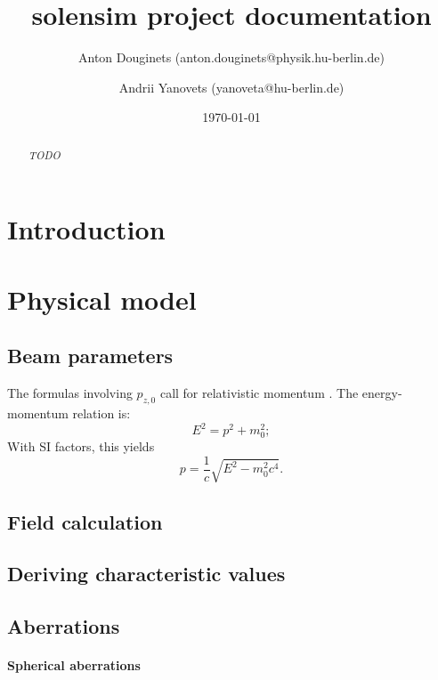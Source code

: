 \documentclass[a4paper,12pt]{article}
\title{solensim project documentation}
\author{Anton Douginets (anton.douginets@physik.hu-berlin.de)
	\and
	Andrii Yanovets (yanoveta@hu-berlin.de)}
\date{\today}
\begin{document}
\thispagestyle{empty}
\maketitle

\begin{abstract}
\textit{TODO}
\end{abstract}

\tableofcontents

\newpage

\section{Introduction}
\newpage

\section{Physical model}
\subsection{Beam parameters}

The formulas involving $p_{z,0}$ call for relativistic momentum \cite[p. 27]{Disser}. The energy-momentum relation is:
\[
E^2 = p^2 + m_0^2;
\]
With SI factors, this yields
\begin{equation}
	p = \frac{1}{c}\sqrt{E^2 - m_0^2c^4}.
\end{equation}

\subsection{Field calculation}

\subsection{Deriving characteristic values}

\subsection{Aberrations}
\paragraph{Spherical aberrations}
\end{document}
